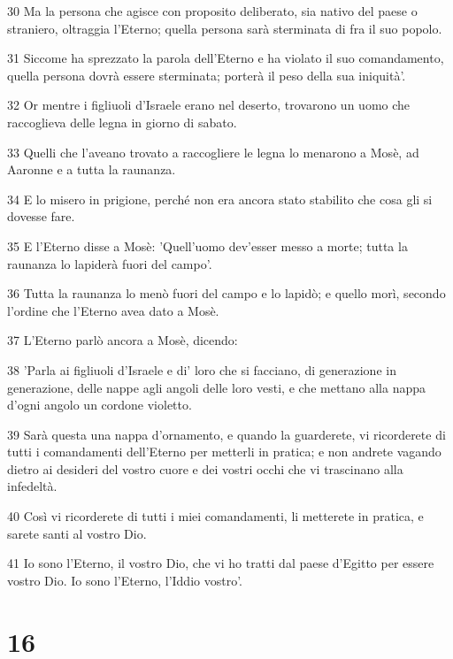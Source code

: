 \par 30 Ma la persona che agisce con proposito deliberato, sia nativo del paese o straniero, oltraggia l'Eterno; quella persona sarà sterminata di fra il suo popolo.
\par 31 Siccome ha sprezzato la parola dell'Eterno e ha violato il suo comandamento, quella persona dovrà essere sterminata; porterà il peso della sua iniquità'.
\par 32 Or mentre i figliuoli d'Israele erano nel deserto, trovarono un uomo che raccoglieva delle legna in giorno di sabato.
\par 33 Quelli che l'aveano trovato a raccogliere le legna lo menarono a Mosè, ad Aaronne e a tutta la raunanza.
\par 34 E lo misero in prigione, perché non era ancora stato stabilito che cosa gli si dovesse fare.
\par 35 E l'Eterno disse a Mosè: 'Quell'uomo dev'esser messo a morte; tutta la raunanza lo lapiderà fuori del campo'.
\par 36 Tutta la raunanza lo menò fuori del campo e lo lapidò; e quello morì, secondo l'ordine che l'Eterno avea dato a Mosè.
\par 37 L'Eterno parlò ancora a Mosè, dicendo:
\par 38 'Parla ai figliuoli d'Israele e di' loro che si facciano, di generazione in generazione, delle nappe agli angoli delle loro vesti, e che mettano alla nappa d'ogni angolo un cordone violetto.
\par 39 Sarà questa una nappa d'ornamento, e quando la guarderete, vi ricorderete di tutti i comandamenti dell'Eterno per metterli in pratica; e non andrete vagando dietro ai desideri del vostro cuore e dei vostri occhi che vi trascinano alla infedeltà.
\par 40 Così vi ricorderete di tutti i miei comandamenti, li metterete in pratica, e sarete santi al vostro Dio.
\par 41 Io sono l'Eterno, il vostro Dio, che vi ho tratti dal paese d'Egitto per essere vostro Dio. Io sono l'Eterno, l'Iddio vostro'.

\chapter{16}

